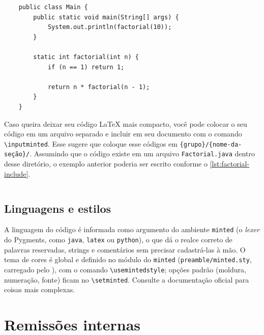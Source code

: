 \begin{listing}[htb]
  \begin{verbatim}
    public class Main {
        public static void main(String[] args) {
            System.out.println(factorial(10));
        }

        static int factorial(int n) {
            if (n == 1) return 1;

            return n * factorial(n - 1);
        }
    }
  \end{verbatim}
  \caption{Fatorial}
  \label{lst:factorial-inline-output}
\end{listing}

Caso queira deixar seu código \LaTeX{} mais compacto, você pode colocar o seu código em um arquivo separado e incluir em seu documento com o comando \texttt{\textbackslash{}inputminted}. Esse \template{} sugere que coloque esse códigos em \contentdir{}\texttt{\{grupo\}/\{nome-da-seção\}/}\codedir. Assumindo que o código existe em um arquivo \texttt{Factorial.java} dentro desse diretório, o exemplo anterior poderia ser escrito conforme o \autoref{lst:factorial-include}.

\begin{listing}[htb]
  \inputminted{latex}{\CurrentFilePath/res/code/factorial-include.tex}
  \caption{Inclusão de código através de um arquivo externo}
  \label{lst:factorial-include}
\end{listing}

\subsection{Linguagens e estilos}

A linguagem do código é informada como argumento do ambiente \texttt{minted} (o \emph{lexer} do Pygments, como \texttt{java}, \texttt{latex} ou \texttt{python}), o que dá o realce correto de palavras reservadas, strings e comentários sem precisar cadastrá-las à mão. O tema de cores é global e definido no módulo do \texttt{minted} (\texttt{preamble/minted.sty}, carregado pelo \pkgfile{}), com o comando \texttt{\textbackslash{}usemintedstyle}; opções padrão (moldura, numeração, fonte) ficam no \texttt{\textbackslash{}setminted}. Consulte a documentação oficial para coisas mais complexas.

\section{Remissões internas} \label{sec:cross-ref}

